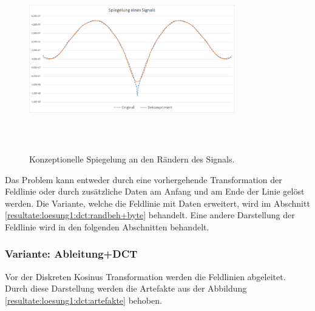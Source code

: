 \begin{figure}[!htbp]
	\center
	\includegraphics[width=0.8\textwidth,height=8cm,keepaspectratio]{./pictures/resultate/loesung1/loesung1-0/spiegelung.png}
	\caption{Konzeptionelle Spiegelung an den Rändern des Signals.}
	\label{resultate:loesung1:dct:spiegelung}
\end{figure}
Das Problem kann entweder durch eine vorhergehende Transformation der Feldlinie oder durch zusätzliche Daten am Anfang und am Ende der Linie gelöst werden. Die Variante, welche die Feldlinie mit Daten erweitert, wird im Abschnitt \ref{resultate:loesung1:dct:randbeh+byte} behandelt. Eine andere Darstellung der Feldlinie wird in den folgenden Abschnitten behandelt.

\subsubsection{Variante: Ableitung+DCT}\label{resultate:dct:ableitung_dct}
Vor der Diskreten Kosinus Transformation werden die Feldlinien abgeleitet. Durch diese Darstellung werden die Artefakte aus der Abbildung \ref{resultate:loesung1:dct:artefakte} behoben.

